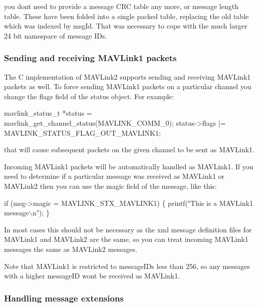 \begin{DoxyItemize}
\item you don\textquotesingle{}t need to provide a message C\+RC table any more, or message length table. These have been folded into a single packed table, replacing the old table which was indexed by msg\+Id. That was necessary to cope with the much larger 24 bit namespace of message I\+Ds.
\end{DoxyItemize}

\subsubsection*{Sending and receiving M\+A\+V\+Link1 packets}

The C implementation of M\+A\+V\+Link2 supports sending and receiving M\+A\+V\+Link1 packets as well. To force sending M\+A\+V\+Link1 packets on a particular channel you change the flags field of the status object. For example\+:


\begin{DoxyCode}
mavlink\_status\_t *status = mavlink\_get\_channel\_status(MAVLINK\_COMM\_0);
status->flags |= MAVLINK\_STATUS\_FLAG\_OUT\_MAVLINK1;
\end{DoxyCode}


that will cause subsequent packets on the given channel to be sent as M\+A\+V\+Link1.

Incoming M\+A\+V\+Link1 packets will be automatically handled as M\+A\+V\+Link1. If you need to determine if a particular message was received as M\+A\+V\+Link1 or M\+A\+V\+Link2 then you can use the magic field of the message, like this\+:


\begin{DoxyCode}
if (msg->magic = MAVLINK\_STX\_MAVLINK1) \{
   printf("This is a MAVLink1 message\(\backslash\)n");
\}
\end{DoxyCode}


In most cases this should not be necessary as the xml message definition files for M\+A\+V\+Link1 and M\+A\+V\+Link2 are the same, so you can treat incoming M\+A\+V\+Link1 messages the same as M\+A\+V\+Link2 messages.

Note that M\+A\+V\+Link1 is restricted to message\+I\+Ds less than 256, so any messages with a higher message\+ID won\textquotesingle{}t be received as M\+A\+V\+Link1.

\subsubsection*{Handling message extensions}

